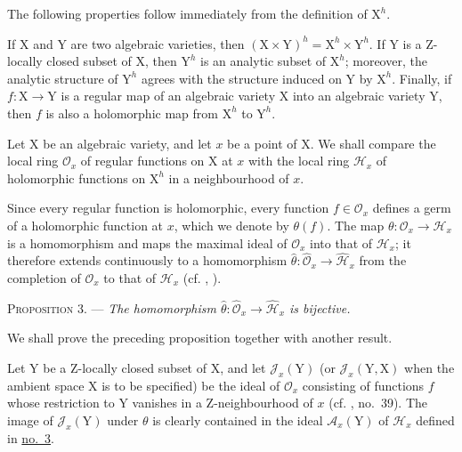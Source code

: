 The following properties follow immediately from the definition of $\mathrm{X}^h$.

If $\mathrm{X}$ and $\mathrm{Y}$ are two algebraic varieties, then $(\mathrm{X}\times\mathrm{Y})^h=\mathrm{X}^h\times\mathrm{Y}^h$. If $\mathrm{Y}$ is a Z-locally closed subset of $\mathrm{X}$, then $\mathrm{Y}^h$ is an analytic subset of $\mathrm{X}^h$; moreover, the analytic structure of $\mathrm{Y}^h$ agrees with the structure induced on $\mathrm{Y}$ by $\mathrm{X}^h$. Finally, if $f:\mathrm{X}\to\mathrm{Y}$ is a regular map of an algebraic variety $\mathrm{X}$ into an algebraic variety $\mathrm{Y}$, then $f$ is also a holomorphic map from $\mathrm{X}^h$ to $\mathrm{Y}^h$.


Let $\mathrm{X}$ be an algebraic variety, and let $x$ be a point of $\mathrm{X}$. We shall compare the local ring $\mathcal{O}_x$ of regular functions on $\mathrm{X}$ at $x$ with the local ring $\mathcal{H}_x$ of holomorphic functions on $\mathrm{X}^h$ in a neighbourhood of $x$.

Since every regular function is holomorphic, every function $f\in\mathcal{O}_x$ defines a germ of a holomorphic function at $x$, which we denote by $\theta(f)$. The map $\theta:\mathcal{O}_x\to\mathcal{H}_x$ is a homomorphism and maps the maximal ideal of $\mathcal{O}_x$ into that of $\mathcal{H}_x$; it therefore extends continuously to a homomorphism $\hat\theta:\hat{\mathcal{O}}_x\to\hat{\mathcal{H}}_x$ from the completion of $\mathcal{O}_x$ to that of $\mathcal{H}_x$ (cf. , ).

\textsc{Proposition 3}. --- \emph{The homomorphism $\hat\theta:\hat{\mathcal{O}}_x\to\hat{\mathcal{H}}_x$ is bijective.}

We shall prove the preceding proposition together with another result.

Let $\mathrm{Y}$ be a Z-locally closed subset of $\mathrm{X}$, and let $\mathcal{J}_x(\mathrm{Y})$ (or $\mathcal{J}_x(\mathrm{Y},\mathrm{X})$ when the ambient space $\mathrm{X}$ is to be specified) be the ideal of $\mathcal{O}_x$ consisting of functions $f$ whose restriction to $\mathrm{Y}$ vanishes in a Z-neighbourhood of $x$ (cf. , no.~39). The image of $\mathcal{J}_x(\mathrm{Y})$ under $\theta$ is clearly contained in the ideal $\mathcal{A}_x(\mathrm{Y})$ of $\mathcal{H}_x$ defined in \hyperref[gaga:no:3]{no.~3}.


